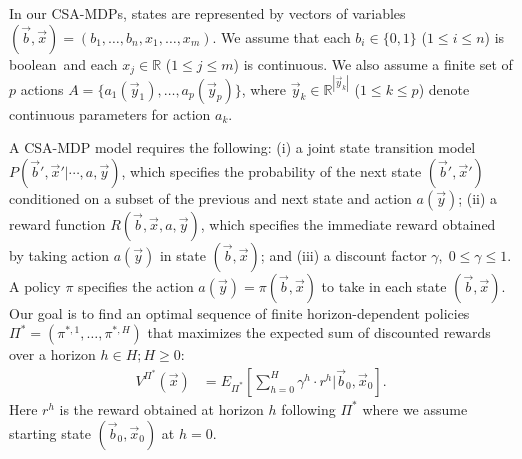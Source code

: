 \label{sec:csamdp}



In our CSA-MDPs, states are represented by vectors of variables
$(\vec{b},\vec{x}) = ( b_1,\ldots,b_n,x_{1},\ldots,x_m )$.  We assume
that each $b_i \in \{ 0,1 \}$ ($1 \leq i \leq n$) is boolean$\,$
and each $x_j \in \mathbb{R}$ ($1 \leq j \leq
m$) is continuous.  We also assume a finite set of $p$ actions $A = \{
a_1(\vec{y}_1), \ldots, a_p(\vec{y}_p) \}$, where 
$\vec{y}_k \in \mathbb{R}^{|\vec{y}_k|}$ ($1
\leq k \leq p$) denote continuous parameters for 
action $a_k$.

A CSA-MDP model requires the following: (i) a joint state transition model
$P(\vec{b}',\vec{x}'|\cdots,a,\vec{y})$, which specifies the
probability of the next state $(\vec{b}',\vec{x}')$ conditioned on a
subset of the previous and next state and action $a(\vec{y})$; (ii) a
reward function $R(\vec{b},\vec{x},a,\vec{y})$, which specifies the
immediate reward obtained by taking action $a(\vec{y})$ in state
$(\vec{b},\vec{x})$; and (iii) a discount factor $\gamma, \; 0 \leq
\gamma \leq 1$.
A policy $\pi$ specifies the action $a(\vec{y}) =
\pi(\vec{b},\vec{x})$ to take in each state $(\vec{b},\vec{x})$.  Our
goal is to find an optimal sequence of finite horizon-dependent
policies
$\Pi^* = (\pi^{*,1},\ldots,\pi^{*,H})$ that
maximizes the expected sum of discounted rewards over a horizon $h \in
H; H \geq 0$:
\begin{align}
V^{\Pi^*}(\vec{x}) & = E_{\Pi^*} \left[ \sum_{h=0}^{H} \gamma^h \cdot r^h \Big| \vec{b}_0,\vec{x}_0 \right]. \label{eq:vfun_def}
\end{align}
Here $r^h$ is the reward obtained at horizon $h$ following $\Pi^*$ where 
we assume starting state $(\vec{b}_0,\vec{x}_0)$ at $h=0$.
 
